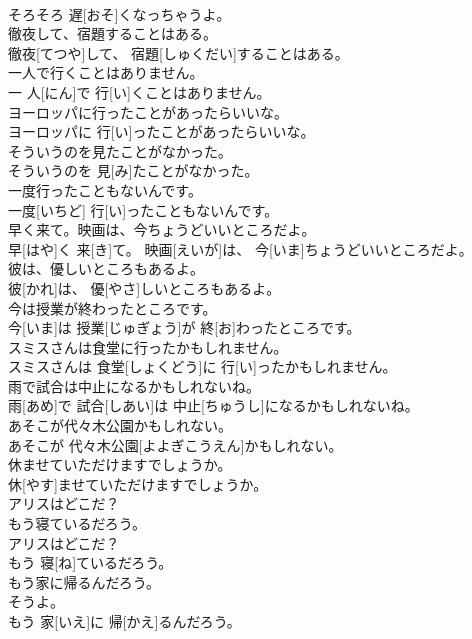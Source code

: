 \documentclass[8pt]{extreport}
\begin{document}
\begin{CJK}{UTF8}{min}
\\	そろそろ 遅[おそ]くなっちゃうよ。	
\\	徹夜して、宿題することはある。	
\\	徹夜[てつや]して、 宿題[しゅくだい]することはある。	
\\	一人で行くことはありません。	
\\	一 人[にん]で 行[い]くことはありません。	
\\	ヨーロッパに行ったことがあったらいいな。	
\\	ヨーロッパに 行[い]ったことがあったらいいな。	
\\	そういうのを見たことがなかった。	
\\	そういうのを 見[み]たことがなかった。	
\\	一度行ったこともないんです。	
\\	一度[いちど] 行[い]ったこともないんです。	
\\	早く来て。映画は、今ちょうどいいところだよ。	
\\	早[はや]く 来[き]て。 映画[えいが]は、 今[いま]ちょうどいいところだよ。	
\\	彼は、優しいところもあるよ。	
\\	彼[かれ]は、 優[やさ]しいところもあるよ。	
\\	今は授業が終わったところです。	
\\	今[いま]は 授業[じゅぎょう]が 終[お]わったところです。	
\\	スミスさんは食堂に行ったかもしれません。	
\\	スミスさんは 食堂[しょくどう]に 行[い]ったかもしれません。	
\\	雨で試合は中止になるかもしれないね。	
\\	雨[あめ]で 試合[しあい]は 中止[ちゅうし]になるかもしれないね。	
\\	あそこが代々木公園かもしれない。	
\\	あそこが 代々木公園[よよぎこうえん]かもしれない。	
\\	休ませていただけますでしょうか。	
\\	休[やす]ませていただけますでしょうか。	
\\	アリスはどこだ？ 
\\	もう寝ているだろう。	
\\	アリスはどこだ？ 
\\	もう 寝[ね]ているだろう。	
\\	もう家に帰るんだろう。 
\\	そうよ。	
\\	もう 家[いえ]に 帰[かえ]るんだろう。 

\end{CJK}
\end{document}

